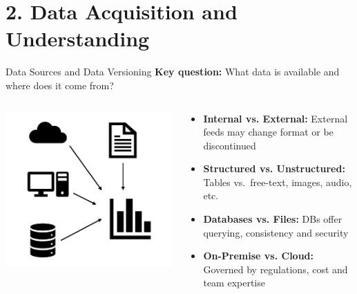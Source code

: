 \documentclass[10pt,compress,t,notes=noshow, xcolor=table]{beamer}
\begin{document}

\section{2. Data Acquisition and Understanding}\label{data-acquisition-and-understanding}

\begin{frame}{Data Sources and Data Versioning}
\label{data-source}
\textbf{Key question:} What data is available and where does it come from?

\bigskip
\begin{columns}[T]
  \begin{column}{0.35\textwidth}
    \centering
    \includegraphics[width=\linewidth]{figure_man/DataSources.png}
  \end{column}

  \begin{column}{0.60\textwidth}
    \begin{itemize}
      \item \textbf{Internal vs. External:} External feeds may change format or be discontinued
      \item \textbf{Structured vs. Unstructured:} Tables vs.\ free-text, images, audio, etc.
      \item \textbf{Databases vs. Files:} DBs offer querying, consistency and security
      \item \textbf{On-Premise vs. Cloud:} Governed by regulations, cost and team expertise
    \end{itemize}
  \end{column}
\end{columns}


\end{frame}
\end{document}
